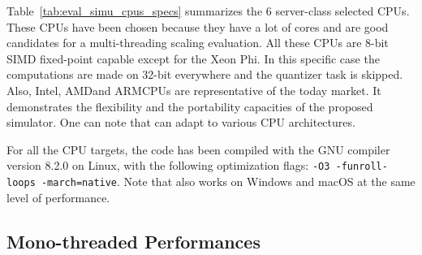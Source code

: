 Table~\ref{tab:eval_simu_cpus_specs} summarizes the 6 server-class selected
CPUs. These CPUs have been chosen because they have a lot of cores and are good
candidates for a multi-threading scaling evaluation. All these CPUs are 8-bit
SIMD fixed-point capable except for the Xeon Phi. In this specific case
the computations are made on 32-bit everywhere and the quantizer task is
skipped. Also, Intel\R, AMD\R and ARM\R CPUs are representative of the today
market. It demonstrates the flexibility and the portability capacities of the
proposed simulator. One can note that \AFFECT can adapt to various CPU
architectures.

For all the CPU targets, the code has been compiled with the \Cxx GNU compiler
version 8.2.0 on Linux, with the following optimization flags:
\verb|-O3 -funroll-loops -march=native|. Note that \AFFECT also works on Windows
and macOS at the same level of performance.

\subsection{Mono-threaded Performances}

\newcommand{\CB}{\cellcolor{Paired-1!15}}
\newcommand{\CR}{\cellcolor{Paired-5!15}}
\newcommand{\BF}[1]{\textbf{#1}}

